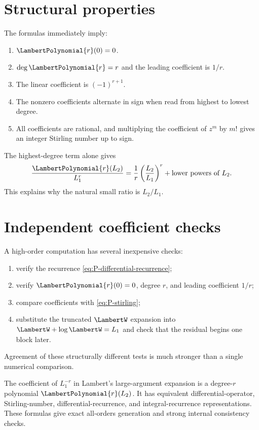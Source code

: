 \documentclass[11pt,oneside]{book}
\theoremstyle{definition}
\theoremstyle{remark}
\begin{document}
\section{Structural properties}
The formulas immediately imply:
\begin{enumerate}
\item $\LambertPolynomial{r}(0)=0$.
\item $\deg \LambertPolynomial{r}=r$ and the leading coefficient is $1/r$.
\item The linear coefficient is $(-1)^{r+1}$.
\item The nonzero coefficients alternate in sign when read from highest to
      lowest degree.
\item All coefficients are rational, and multiplying the coefficient of
      $z^m$ by $m!$ gives an integer Stirling number up to sign.
\end{enumerate}

The highest-degree term alone gives
\[
 \frac{\LambertPolynomial{r}(L_2)}{L_1^r}
 =\frac1r\left(\frac{L_2}{L_1}\right)^r
 +\hbox{lower powers of }L_2.
\]
This explains why the natural small ratio is $L_2/L_1$.

\section{Independent coefficient checks}
A high-order computation has several inexpensive checks:
\begin{enumerate}
\item verify the recurrence \eqref{eq:P-differential-recurrence};
\item verify $\LambertPolynomial{r}(0)=0$, degree $r$, and leading coefficient $1/r$;
\item compare coefficients with \eqref{eq:P-stirling};
\item substitute the truncated $\LambertW$ expansion into $\LambertW+\log \LambertW=L_1$ and check
      that the residual begins one block later.
\end{enumerate}
Agreement of these structurally different tests is much stronger than a
single numerical comparison.

\begin{summarybox}
The coefficient of $L_1^{-r}$ in Lambert's large-argument expansion is a
degree-$r$ polynomial $\LambertPolynomial{r}(L_2)$.  It has equivalent differential-operator,
Stirling-number, differential-recurrence, and integral-recurrence
representations.  These formulas give exact all-orders generation and strong
internal consistency checks.
\end{summarybox}
\end{document}
